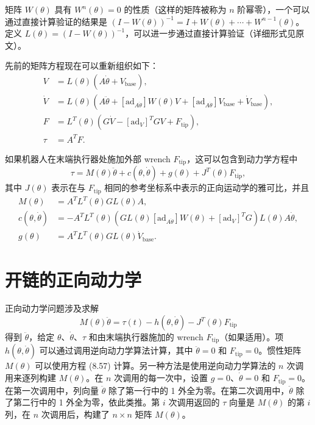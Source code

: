 \documentclass[12pt,a4paper]{article}
\begin{document}
矩阵 $W(\theta)$ 具有 $W^n(\theta) = 0$ 的性质（这样的矩阵被称为 $n$ 阶幂零），一个可以通过直接计算验证的结果是 $(I-W(\theta))^{-1} = I + W(\theta) + \cdots + W^{n-1}(\theta)$。定义 $L(\theta) = (I-W(\theta))^{-1}$，可以进一步通过直接计算验证（详细形式见原文）。

先前的矩阵方程现在可以重新组织如下：
\begin{align}
V &= L(\theta)(A\dot{\theta} + V_{\text{base}}), \label{eq:8.73} \\
\dot{V} &= L(\theta)(A\ddot{\theta} + [\text{ad}_{A\dot{\theta}}]W(\theta)V + [\text{ad}_{A\dot{\theta}}]V_{\text{base}} + \dot{V}_{\text{base}}), \label{eq:8.74} \\
F &= L^T(\theta)(G\dot{V} - [\text{ad}_V]^T GV + F_{\text{tip}}), \label{eq:8.75} \\
\tau &= A^T F. \label{eq:8.76}
\end{align}

如果机器人在末端执行器处施加外部 wrench $F_{\text{tip}}$，这可以包含到动力学方程中
\begin{equation}
\tau = M(\theta)\ddot{\theta} + c(\theta, \dot{\theta}) + g(\theta) + J^T(\theta)F_{\text{tip}}, \label{eq:8.77}
\end{equation}
其中 $J(\theta)$ 表示在与 $F_{\text{tip}}$ 相同的参考坐标系中表示的正向运动学的雅可比，并且
\begin{align}
M(\theta) &= A^T L^T(\theta)GL(\theta)A, \label{eq:8.78} \\
c(\theta, \dot{\theta}) &= -A^T L^T(\theta)\left(GL(\theta)[\text{ad}_{A\dot{\theta}}]W(\theta) + [\text{ad}_V]^T G\right)L(\theta)A\dot{\theta}, \label{eq:8.79} \\
g(\theta) &= A^T L^T(\theta)GL(\theta)\dot{V}_{\text{base}}. \label{eq:8.80}
\end{align}

\section{开链的正向动力学}
正向动力学问题涉及求解
\begin{equation}
M(\theta)\ddot{\theta} = \tau(t) - h(\theta, \dot{\theta}) - J^T(\theta)F_{\text{tip}} \label{eq:8.81}
\end{equation}
得到 $\ddot{\theta}$，给定 $\theta$、$\dot{\theta}$、$\tau$ 和由末端执行器施加的 wrench $F_{\text{tip}}$（如果适用）。项 $h(\theta, \dot{\theta})$ 可以通过调用逆向动力学算法计算，其中 $\ddot{\theta} = 0$ 和 $F_{\text{tip}} = 0$。惯性矩阵 $M(\theta)$ 可以使用方程 (8.57) 计算。另一种方法是使用逆向动力学算法的 $n$ 次调用来逐列构建 $M(\theta)$。在 $n$ 次调用的每一次中，设置 $g = 0$、$\dot{\theta} = 0$ 和 $F_{\text{tip}} = 0$。在第一次调用中，列向量 $\ddot{\theta}$ 除了第一行中的 1 外全为零。在第二次调用中，$\ddot{\theta}$ 除了第二行中的 1 外全为零，依此类推。第 $i$ 次调用返回的 $\tau$ 向量是 $M(\theta)$ 的第 $i$ 列，在 $n$ 次调用后，构建了 $n \times n$ 矩阵 $M(\theta)$。
\end{document}
